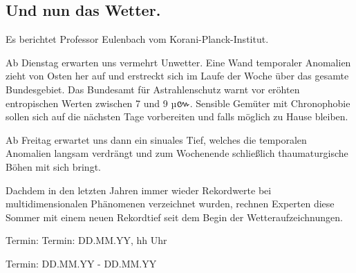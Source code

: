 \documentclass[final]{multiversum}
\begin{document}
\subsection{Und nun das Wetter.} 
Es berichtet Professor Eulenbach vom Korani-Planck-Institut.

Ab Dienstag erwarten uns vermehrt Unwetter. Eine Wand temporaler Anomalien zieht von Osten her auf und erstreckt sich im Laufe der Woche über das gesamte Bundesgebiet. Das Bundesamt für Astrahlenschutz warnt vor eröhten entropischen Werten zwischen 7 und 9 µ{\khmerfont៚}. Sensible Gemüter mit Chronophobie sollen sich auf die nächsten Tage vorbereiten und falls möglich zu Hause bleiben.

Ab Freitag erwartet uns dann ein sinuales Tief, welches die temporalen Anomalien langsam verdrängt und zum Wochenende schließlich thaumaturgische Böhen mit sich bringt. 

Dachdem in den letzten Jahren immer wieder Rekordwerte bei multidimensionalen Phänomenen verzeichnet wurden, rechnen Experten diese Sommer mit einem neuen Rekordtief seit dem Begin der Wetteraufzeichnungen. 

\begin{termine}
\item Termin: Termin: DD.MM.YY, hh Uhr
  \item Termin: DD.MM.YY - DD.MM.YY
\end{termine}
\impressum
\end{document}
